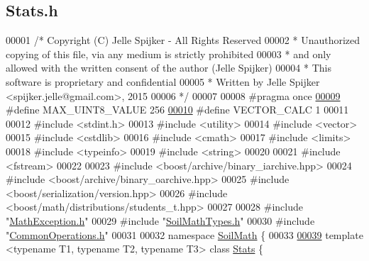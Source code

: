 \hypertarget{_stats_8h_source}{}\subsection{Stats.\+h}
\label{_stats_8h_source}

\begin{DoxyCode}
00001 \textcolor{comment}{/* Copyright (C) Jelle Spijker - All Rights Reserved}
00002 \textcolor{comment}{ * Unauthorized copying of this file, via any medium is strictly prohibited}
00003 \textcolor{comment}{ * and only allowed with the written consent of the author (Jelle Spijker)}
00004 \textcolor{comment}{ * This software is proprietary and confidential}
00005 \textcolor{comment}{ * Written by Jelle Spijker <spijker.jelle@gmail.com>, 2015}
00006 \textcolor{comment}{ */}
00007 
00008 \textcolor{preprocessor}{#pragma once}
\hypertarget{_stats_8h_source_l00009}{}\hyperlink{_stats_8h_a3db36e4d6027332cc759a581cfc715e2}{00009} \textcolor{preprocessor}{#define MAX\_UINT8\_VALUE 256}
\hypertarget{_stats_8h_source_l00010}{}\hyperlink{_stats_8h_a95ab35e4385bfca01b19afc5ca5c33e9}{00010} \textcolor{preprocessor}{#define VECTOR\_CALC 1}
00011 
00012 \textcolor{preprocessor}{#include <stdint.h>}
00013 \textcolor{preprocessor}{#include <utility>}
00014 \textcolor{preprocessor}{#include <vector>}
00015 \textcolor{preprocessor}{#include <cstdlib>}
00016 \textcolor{preprocessor}{#include <cmath>}
00017 \textcolor{preprocessor}{#include <limits>}
00018 \textcolor{preprocessor}{#include <typeinfo>}
00019 \textcolor{preprocessor}{#include <string>}
00020 
00021 \textcolor{preprocessor}{#include <fstream>}
00022 
00023 \textcolor{preprocessor}{#include <boost/archive/binary\_iarchive.hpp>}
00024 \textcolor{preprocessor}{#include <boost/archive/binary\_oarchive.hpp>}
00025 \textcolor{preprocessor}{#include <boost/serialization/version.hpp>}
00026 \textcolor{preprocessor}{#include <boost/math/distributions/students\_t.hpp>}
00027 
00028 \textcolor{preprocessor}{#include "\hyperlink{_math_exception_8h}{MathException.h}"}
00029 \textcolor{preprocessor}{#include "\hyperlink{_soil_math_types_8h}{SoilMathTypes.h}"}
00030 \textcolor{preprocessor}{#include "\hyperlink{_common_operations_8h}{CommonOperations.h}"}
00031 
00032 \textcolor{keyword}{namespace }\hyperlink{namespace_soil_math}{SoilMath} \{
00033 
\hypertarget{_stats_8h_source_l00039}{}\hyperlink{class_soil_math_1_1_stats}{00039} \textcolor{keyword}{template} <\textcolor{keyword}{typename} T1, \textcolor{keyword}{typename} T2, \textcolor{keyword}{typename} T3> \textcolor{keyword}{class }\hyperlink{class_soil_math_1_1_stats}{Stats} \{

\end{DoxyCode}
